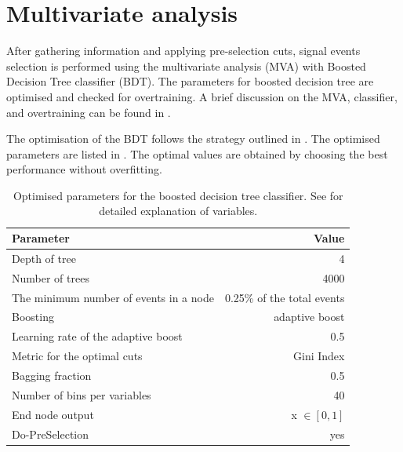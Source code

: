 \section{Multivariate analysis}
\label{sec:doubleHiggsMVA}
After gathering information and applying  pre-selection cuts, signal events selection is performed using the multivariate analysis (MVA) with Boosted Decision Tree classifier (BDT). The parameters for boosted decision tree are optimised and checked for overtraining. A brief discussion on the MVA, classifier, and overtraining can be found in .

The optimisation of the BDT follows the strategy outlined in . The optimised parameters are listed in . The optimal values are obtained by choosing the best performance without overfitting.

\begin{table}[!tbp]\centering
\small
\begin{tabular}{lr}
\hline \hline
 Parameter &  Value \\
\hline
Depth of tree & 4 \\
Number of trees & 4000 \\
The minimum number of events in a node &  0.25\% of the total events \\
Boosting & adaptive boost \\
Learning rate of the adaptive boost & 0.5 \\
Metric for the optimal cuts & Gini Index \\
Bagging fraction & 0.5 \\
Number of bins per variables & 40 \\
End node output & x $\in [0,1]$ \\
Do-PreSelection & yes \\
\hline \hline
\end{tabular}

\caption
{Optimised parameters for the boosted decision tree classifier. See  for detailed explanation of variables.}
\label{tab:doubleHiggsBDTparameters}
\end{table}

